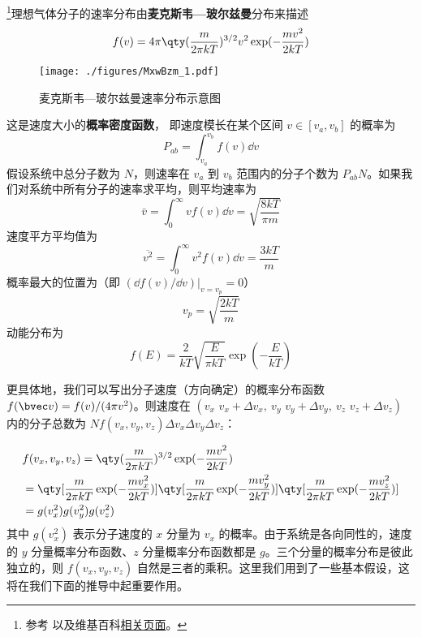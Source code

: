\footnote{参考 \cite{新热} 以及维基百科\href{https://en.wikipedia.org/wiki/Maxwell-Boltzmann_distribution}{相关页面}。}理想气体分子的速率分布由\textbf{麦克斯韦—玻尔兹曼}分布来描述
\begin{equation}
f(v) = 4\pi \qty(\frac{m}{2\pi kT})^{3/2} v^2 \exp(-\frac{mv^2}{2kT})
\end{equation}
\begin{figure}[ht]
\centering
\texttt{[image: ./figures/MxwBzm\_1.pdf]}
\caption{麦克斯韦—玻尔兹曼速率分布示意图} \label{MxwBzm_fig1}
\end{figure}
这是速度大小的\textbf{概率密度函数}， 即速度模长在某个区间 $v \in [v_a, v_b]$ 的概率为
\begin{equation}
P_{ab} = \int_{v_a}^{v_b} f(v) \dd{v}
\end{equation}
假设系统中总分子数为 $N$，则速率在 $v_a$ 到 $v_b$ 范围内的分子个数为 $P_{ab}N$。如果我们对系统中所有分子的速率求平均，则平均速率为
\begin{equation}
\bar v = \int_{0}^\infty v f(v)\dd v= \sqrt{\frac{8kT}{\pi m}}
\end{equation}
速度平方平均值为
\begin{equation}\label{MxwBzm_eq1}
\overline {v^2} = \int_{0}^\infty v^2 f(v)\dd v = \frac{3kT}{m}
\end{equation}
概率最大的位置为（即 $(\dd f(v)/\dd v)|_{v=v_p}=0$）
\begin{equation}
v_p =\sqrt{\frac{2kT}{m}}
\end{equation}
动能分布为
\begin{equation}
f(E) = \frac{2}{kT}\sqrt{\frac{E}{\pi kT}} \exp(-\frac{E}{kT})
\end{equation}

更具体地，我们可以写出分子速度（方向确定）的概率分布函数 $f(\bvec v)=f(v)/(4\pi v^2)$。则速度在 $(v_x\text{~}v_x+\Delta v_x,\ v_y\text{~}v_y+\Delta v_y,\ v_z\text{~}v_z+\Delta v_z)$ 内的分子总数为 $N f(v_x,v_y,v_z)\Delta v_x\Delta v_y\Delta v_z$：

\begin{equation}
\begin{aligned}
&f(v_x,v_y,v_z)=\qty(\frac{m}{2\pi k T})^{3/2}\exp(-\frac{mv^2}{2kT})\\
&=\qty[\frac{m}{2\pi kT}\exp(-\frac{mv_x^2}{2kT})]\qty[\frac{m}{2\pi kT}\exp(-\frac{mv_y^2}{2kT})]\qty[\frac{m}{2\pi kT}\exp(-\frac{mv_z^2}{2kT})]\\
&=g(v_x^2)g(v_y^2)g(v_z^2)
\end{aligned}
\end{equation}
其中 $g(v_x^2)$ 表示分子速度的 $x$ 分量为 $v_x$ 的概率。由于系统是各向同性的，速度的 $y$ 分量概率分布函数、$z$ 分量概率分布函数都是 $g$。三个分量的概率分布是彼此独立的，则 $f(v_x,v_y,v_z)$ 自然是三者的乘积。这里我们用到了一些基本假设，这将在我们下面的推导中起重要作用。


